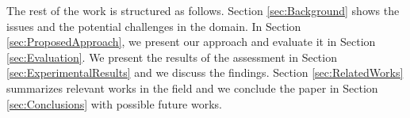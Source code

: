 The rest of the work is structured as follows. Section \ref{sec:Background} shows the issues and the potential challenges in the domain. In Section \ref{sec:ProposedApproach}, we present our approach and evaluate it in Section \ref{sec:Evaluation}. We present the results of the assessment in Section \ref{sec:ExperimentalResults} and we discuss the findings. Section \ref{sec:RelatedWorks} summarizes relevant works in the field and we conclude the paper in Section \ref{sec:Conclusions} with possible future works.

